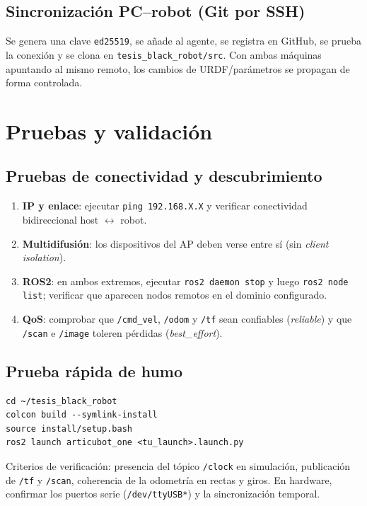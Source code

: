 \subsection{Sincronización PC--robot (Git por SSH)}
Se genera una clave \texttt{ed25519}, se añade al agente, se registra en GitHub, se prueba la conexión y se clona en \texttt{tesis\_black\_robot/src}. Con ambas máquinas apuntando al mismo remoto, los cambios de URDF/parámetros se propagan de forma controlada.

\section{Pruebas y validación}

\subsection{Pruebas de conectividad y descubrimiento}
\begin{enumerate}
  \item \textbf{IP y enlace}: ejecutar \texttt{ping 192.168.X.X} y verificar conectividad bidireccional host $\leftrightarrow$ robot.
  \item \textbf{Multidifusión}: los dispositivos del AP deben verse entre sí (sin \emph{client isolation}).
  \item \textbf{\gls{ROS2}}: en ambos extremos, ejecutar \texttt{ros2 daemon stop} y luego \texttt{ros2 node list}; verificar que aparecen nodos remotos en el dominio configurado.
  \item \textbf{QoS}: comprobar que \texttt{/cmd\_vel}, \texttt{/odom} y \texttt{/tf} sean confiables (\textit{reliable}) y que \texttt{/scan} e \texttt{/image} toleren pérdidas (\textit{best\_effort}).
\end{enumerate}

\subsection{Prueba rápida de humo}
\begin{verbatim}
cd ~/tesis_black_robot
colcon build --symlink-install
source install/setup.bash
ros2 launch articubot_one <tu_launch>.launch.py
\end{verbatim}

Criterios de verificación: presencia del tópico \texttt{/clock} en simulación, publicación de \texttt{/tf} y \texttt{/scan}, coherencia de la odometría en rectas y giros. En hardware, confirmar los puertos serie (\texttt{/dev/ttyUSB*}) y la sincronización temporal.

